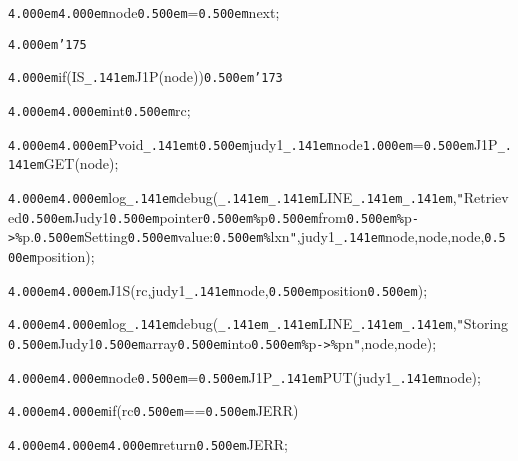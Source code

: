 \noindent
{}{\tt\mc \kern4.000em}{\tt\mc \kern4.000em}node{\tt\mc \kern0.500em}={\tt\mc \kern0.500em}next;

\noindent
{}{\tt\mc \kern4.000em}{\tt\char'175}

\noindent
{}\hfill

\noindent
{}{\tt\mc \kern4.000em}if(IS{\tt\_\kern.141em}J1P({\tt *}node)){\tt\mc \kern0.500em}{\tt\char'173}

\noindent
{}{\tt\mc \kern4.000em}{\tt\mc \kern4.000em}int{\tt\mc \kern0.500em}rc;

\noindent
{}{\tt\mc \kern4.000em}{\tt\mc \kern4.000em}Pvoid{\tt\_\kern.141em}t{\tt\mc \kern0.500em}judy1{\tt\_\kern.141em}node{\tt\mc \kern1.000em}={\tt\mc \kern0.500em}J1P{\tt\_\kern.141em}GET({\tt *}node);

\noindent
{}\hfill

\noindent
{}{\tt\mc \kern4.000em}{\tt\mc \kern4.000em}log{\tt\_\kern.141em}debug({\tt\_\kern.141em}{\tt\_\kern.141em}LINE{\tt\_\kern.141em}{\tt\_\kern.141em},{\tt "}Retrieved{\tt\mc \kern0.500em}Judy1{\tt\mc \kern0.500em}pointer{\tt\mc \kern0.500em}{\tt\%}p{\tt\mc \kern0.500em}from{\tt\mc \kern0.500em}{\tt\%}p{\tt -}{\tt >}{\tt\%}p.{\tt\mc \kern0.500em}Setting{\tt\mc \kern0.500em}value:{\tt\mc \kern0.500em}{\tt\%}lx{\tt{}}n{\tt "},judy1{\tt\_\kern.141em}node,node,{\tt *}node,{\tt\mc \kern0.500em}position);

\noindent
{}\hfill

\noindent
{}{\tt\mc \kern4.000em}{\tt\mc \kern4.000em}J1S(rc,judy1{\tt\_\kern.141em}node,{\tt\mc \kern0.500em}position{\tt\mc \kern0.500em});

\noindent
{}\hfill

\noindent
{}{\tt\mc \kern4.000em}{\tt\mc \kern4.000em}log{\tt\_\kern.141em}debug({\tt\_\kern.141em}{\tt\_\kern.141em}LINE{\tt\_\kern.141em}{\tt\_\kern.141em},{\tt "}Storing{\tt\mc \kern0.500em}Judy1{\tt\mc \kern0.500em}array{\tt\mc \kern0.500em}into{\tt\mc \kern0.500em}{\tt\%}p{\tt -}{\tt >}{\tt\%}p{\tt{}}n{\tt "},node,{\tt *}node);

\noindent
{}\hfill

\noindent
{}{\tt\mc \kern4.000em}{\tt\mc \kern4.000em}{\tt *}node{\tt\mc \kern0.500em}={\tt\mc \kern0.500em}J1P{\tt\_\kern.141em}PUT(judy1{\tt\_\kern.141em}node);

\noindent
{}{\tt\mc \kern4.000em}{\tt\mc \kern4.000em}if(rc{\tt\mc \kern0.500em}=={\tt\mc \kern0.500em}JERR)

\noindent
{}{\tt\mc \kern4.000em}{\tt\mc \kern4.000em}{\tt\mc \kern4.000em}return{\tt\mc \kern0.500em}JERR;

